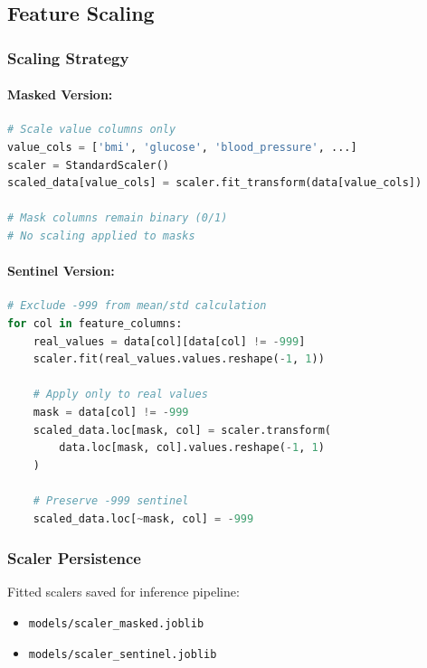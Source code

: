 \documentclass[12pt,a4paper]{article}
\begin{document}
\subsection{Feature Scaling}

\subsubsection{Scaling Strategy}

\paragraph{Masked Version:}
\begin{lstlisting}[language=Python]
# Scale value columns only
value_cols = ['bmi', 'glucose', 'blood_pressure', ...]
scaler = StandardScaler()
scaled_data[value_cols] = scaler.fit_transform(data[value_cols])

# Mask columns remain binary (0/1)
# No scaling applied to masks
\end{lstlisting}

\paragraph{Sentinel Version:}
\begin{lstlisting}[language=Python]
# Exclude -999 from mean/std calculation
for col in feature_columns:
    real_values = data[col][data[col] != -999]
    scaler.fit(real_values.values.reshape(-1, 1))
    
    # Apply only to real values
    mask = data[col] != -999
    scaled_data.loc[mask, col] = scaler.transform(
        data.loc[mask, col].values.reshape(-1, 1)
    )
    
    # Preserve -999 sentinel
    scaled_data.loc[~mask, col] = -999
\end{lstlisting}

\subsubsection{Scaler Persistence}
Fitted scalers saved for inference pipeline:
\begin{itemize}
    \item \texttt{models/scaler\_masked.joblib}
    \item \texttt{models/scaler\_sentinel.joblib}
\end{itemize}
\end{document}
